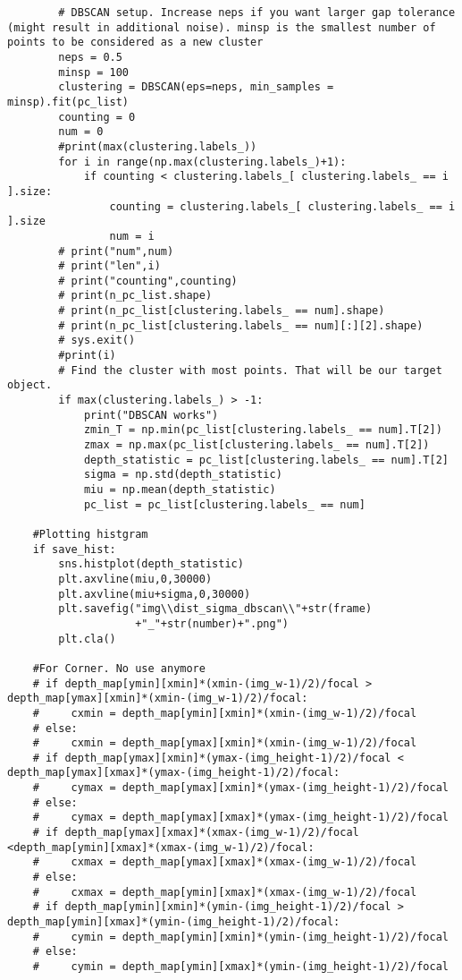 \begin{verbatim}
        # DBSCAN setup. Increase neps if you want larger gap tolerance (might result in additional noise). minsp is the smallest number of points to be considered as a new cluster
        neps = 0.5
        minsp = 100
        clustering = DBSCAN(eps=neps, min_samples = minsp).fit(pc_list)
        counting = 0
        num = 0
        #print(max(clustering.labels_))
        for i in range(np.max(clustering.labels_)+1):
            if counting < clustering.labels_[ clustering.labels_ == i ].size:
                counting = clustering.labels_[ clustering.labels_ == i ].size
                num = i
        # print("num",num)
        # print("len",i)
        # print("counting",counting)
        # print(n_pc_list.shape)
        # print(n_pc_list[clustering.labels_ == num].shape)
        # print(n_pc_list[clustering.labels_ == num][:][2].shape)
        # sys.exit()
        #print(i)
        # Find the cluster with most points. That will be our target object.
        if max(clustering.labels_) > -1:
            print("DBSCAN works")
            zmin_T = np.min(pc_list[clustering.labels_ == num].T[2])
            zmax = np.max(pc_list[clustering.labels_ == num].T[2])
            depth_statistic = pc_list[clustering.labels_ == num].T[2]
            sigma = np.std(depth_statistic)
            miu = np.mean(depth_statistic)
            pc_list = pc_list[clustering.labels_ == num]

    #Plotting histgram
    if save_hist:
        sns.histplot(depth_statistic)
        plt.axvline(miu,0,30000)
        plt.axvline(miu+sigma,0,30000)
        plt.savefig("img\\dist_sigma_dbscan\\"+str(frame)
                    +"_"+str(number)+".png")
        plt.cla()

    #For Corner. No use anymore
    # if depth_map[ymin][xmin]*(xmin-(img_w-1)/2)/focal > depth_map[ymax][xmin]*(xmin-(img_w-1)/2)/focal:
    #     cxmin = depth_map[ymin][xmin]*(xmin-(img_w-1)/2)/focal
    # else:
    #     cxmin = depth_map[ymax][xmin]*(xmin-(img_w-1)/2)/focal
    # if depth_map[ymax][xmin]*(ymax-(img_height-1)/2)/focal < depth_map[ymax][xmax]*(ymax-(img_height-1)/2)/focal:
    #     cymax = depth_map[ymax][xmin]*(ymax-(img_height-1)/2)/focal
    # else:
    #     cymax = depth_map[ymax][xmax]*(ymax-(img_height-1)/2)/focal
    # if depth_map[ymax][xmax]*(xmax-(img_w-1)/2)/focal <depth_map[ymin][xmax]*(xmax-(img_w-1)/2)/focal:
    #     cxmax = depth_map[ymax][xmax]*(xmax-(img_w-1)/2)/focal
    # else:
    #     cxmax = depth_map[ymin][xmax]*(xmax-(img_w-1)/2)/focal
    # if depth_map[ymin][xmin]*(ymin-(img_height-1)/2)/focal > depth_map[ymin][xmax]*(ymin-(img_height-1)/2)/focal:
    #     cymin = depth_map[ymin][xmin]*(ymin-(img_height-1)/2)/focal
    # else:
    #     cymin = depth_map[ymin][xmax]*(ymin-(img_height-1)/2)/focal



\end{verbatim}
